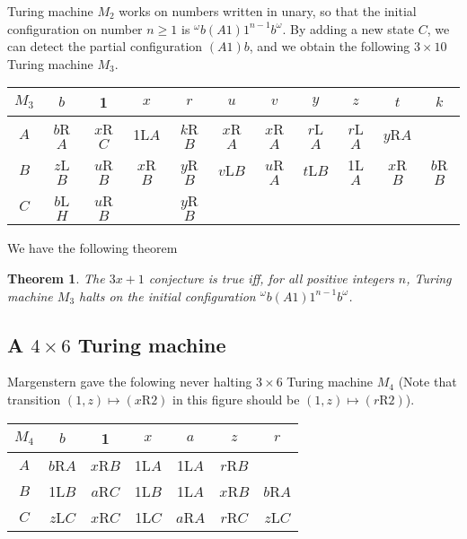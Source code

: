 \documentclass[10pt]{article}
\newtheorem{thm}[prop]{Theorem}
\begin{document}
Turing machine $M_2$ works on numbers written in unary, so that the initial
configuration on number $n \ge 1$ is $^\omega b(A1)1^{n-1}b^\omega$.
By adding a new state $C$, we can detect the partial configuration
$(A1)b$, and we obtain the following $3 \times 10$ Turing machine $M_3$.

\begin{center}
\begin{tabular}{|c|c|c|c|c|c|c|c|c|c|c|}
\hline
$M_3$ &  $b$  &    1    &   $x$   &   $r$   &   $u$   
    &  $v$  &    $y$    &   $z$   &   $t$   &   $k$   \\
\hline
$A$ & $b$R$A$ & $x$R$C$ &  1L$A$  & $k$R$B$ & $x$R$A$ 
& $x$R$A$ & $r$L$A$ & $r$L$A$ & $y$R$A$ &         \\
\hline
$B$ & $z$L$B$ & $u$R$B$ & $x$R$B$ & $y$R$B$ & $v$L$B$ 
& $u$R$A$ & $t$L$B$ &  1L$A$  & $x$R$B$ & $b$R$B$ \\
\hline
$C$ & $b$L$H$ & $u$R$B$ &         & $y$R$B$ &         
 &         &         &         &         &         \\
\hline
\end{tabular}
\end{center}

We have the following theorem
\begin{thm}
The $3x + 1$ conjecture is true iff, for all positive integers $n$,
Turing machine $M_3$ halts on the initial configuration $^\omega b(A1)1^{n-1}b^\omega$.
\end{thm}

\subsection{A $4 \times 6$ Turing machine}
Margenstern \cite[Fig.\ 10]{Ma00} gave the folowing never halting $3 \times 6$
Turing machine $M_4$ (Note that transition $(1,z) \mapsto (x\mbox{R}2)$
in this figure should be $(1,z) \mapsto (r\mbox{R}2)$).

\begin{center}
\begin{tabular}{|c|c|c|c|c|c|c|}
\hline
$M_4$ &  $b$  &    1    & $x$   &    $a$  &   $z$   &  $r$ \\
\hline
$A$ & $b$R$A$ & $x$R$B$ & 1L$A$ &  1L$A$  & $r$R$B$ & \\
\hline
$B$ &  1L$B$  & $a$R$C$ & 1L$B$ &  1L$A$  & $x$R$B$ & $b$R$A$ \\
\hline
$C$ & $z$L$C$ & $x$R$C$ & 1L$C$ & $a$R$A$ & $r$R$C$ & $z$L$C$ \\
\hline
\end{tabular}
\end{center}
\end{document}

